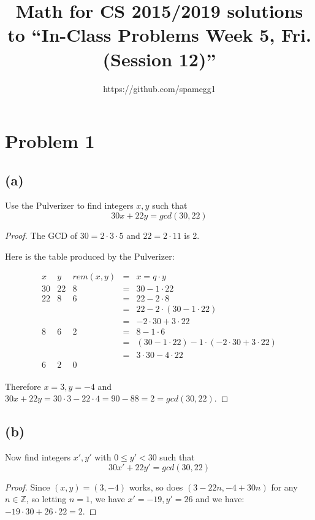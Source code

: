 \documentclass[14pt]{extarticle}
\title{Math for CS 2015/2019 solutions to ``In-Class Problems Week 5, Fri. (Session 12)''}
\author{https://github.com/spamegg1}
\begin{document}
\maketitle
\tableofcontents

\section{Problem 1}
\subsection{(a)}
Use the Pulverizer to find integers $x, y$ such that
$$
30x + 22y = gcd(30, 22)
$$
\begin{proof}
The GCD of $30 = 2 \cdot 3 \cdot 5$ and $22 = 2 \cdot 11$ is 2.

Here is the table produced by the Pulverizer:

$$
\begin{array}{ccrcl}
x & y & rem(x, y) & = & x = q\cdot y \\
\hline
30 & 22 & 8 & = & 30 - 1 \cdot 22\\
22 & 8 & 6 & = & 22 - 2 \cdot 8\\
 &  &  & = & 22 - 2 \cdot (30 - 1 \cdot 22)\\
 &  &  & = & - 2 \cdot 30 + 3 \cdot 22\\
8 & 6 & 2 & = & 8 - 1 \cdot 6\\
 &  &  & = & (30 - 1 \cdot 22) - 1 \cdot (- 2 \cdot 30 + 3 \cdot 22)\\
 &  &  & = & \boxed{3 \cdot 30 - 4 \cdot 22}\\
6 & 2 & 0 &  & \\
 &  &  &  & \\
 &  &  &  & \\
\end{array}
$$
Therefore $x = 3, y = -4$ and $30x + 22y = 30 \cdot 3 - 22 \cdot 4 = 90 - 88 = 2 = gcd(30, 22)$.
\end{proof}

\subsection{(b)}
Now find integers $x', y'$ with $0 \leq y' < 30$ such that
$$
30x' + 22y' = gcd(30, 22)
$$
\begin{proof}
Since $(x, y) = (3, -4)$ works, so does $(3 - 22n, -4 + 30n)$ for any $n \in \mathbb{Z}$, so letting $n = 1$, we have $x' = -19, y' = 26$ and we have: $-19 \cdot 30 + 26 \cdot 22 = 2$.
\end{proof}
\end{document}
